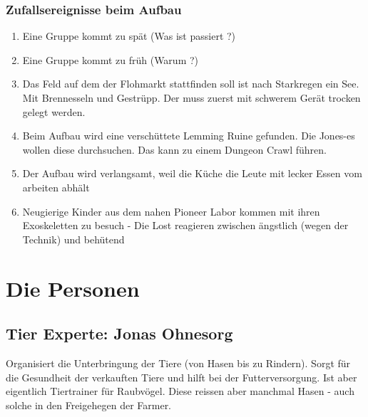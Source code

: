 \subsection{Zufallsereignisse beim Aufbau}

\begin{enumerate}
\item Eine Gruppe kommt zu spät (Was ist passiert ?)
\item Eine Gruppe kommt zu früh (Warum ?)
\item Das Feld auf dem der Flohmarkt stattfinden soll ist nach Starkregen ein See. Mit Brennesseln und Gestrüpp. Der muss zuerst mit schwerem Gerät trocken gelegt werden.
\item Beim Aufbau wird eine verschüttete Lemming Ruine gefunden. Die Jones-es wollen diese durchsuchen. Das kann zu einem Dungeon Crawl führen.
\item Der Aufbau wird verlangsamt, weil die Küche die Leute mit lecker Essen vom arbeiten abhält
\item Neugierige Kinder aus dem nahen Pioneer Labor kommen mit ihren Exoskeletten zu besuch - Die Lost reagieren zwischen ängstlich (wegen der Technik) und behütend
\end{enumerate}

\chapter{Die Personen}

\section{Tier Experte: Jonas Ohnesorg}

Organisiert die Unterbringung der Tiere (von Hasen bis zu Rindern). Sorgt für die Gesundheit der verkauften Tiere und hilft bei der Futterversorgung. Ist aber eigentlich Tiertrainer für Raubvögel. Diese reissen aber manchmal Hasen - auch solche in den Freigehegen der Farmer.

